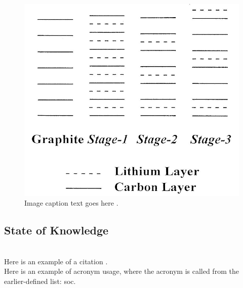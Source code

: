 \documentclass[pdftex,12pt,a4paper]{article}
\begin{document}
\begin{figure}[h]	%
	\centering
	\includegraphics[scale=0.25]{Images/staging}
	\captionsetup{justification=centering}	%
	\caption{Image caption text goes here \cite{Zheng1995} \cite{Yazami2006}.}
	\label{fig:staging}	%
\end{figure}

\blindtext		%

\subsection{State of Knowledge} \label{sec:state of knowledge}
\blindtext \\	%

Here is an example of a citation \cite{Doyle1995a}. \\	%

Here is an example of acronym usage, where the acronym is called from the earlier-defined list: \gls{soc}. \\		%
\end{document}
